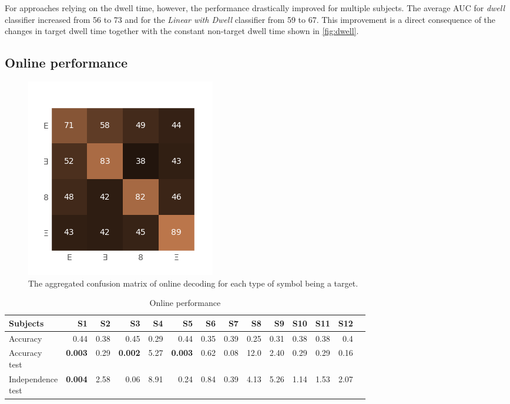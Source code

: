 \documentclass[12pt]{iopart}
\begin{document}
For approaches relying on the dwell time, however, the performance drastically improved
for multiple subjects. The average AUC for \textit{dwell} classifier increased
from 56 to 73 and for the \textit{Linear with Dwell} classifier from 59 to 67.
This improvement is a direct consequence of the changes in target dwell time
together with the constant non-target dwell time shown in \ref{fig:dwell}.


\subsection{Online performance}

\begin{figure}[!t]
    \includegraphics[trim={0cm 0cm 0cm 0cm},clip,width=0.5\columnwidth]{../images/OnlineConfusion.png}
    \caption{The aggregated confusion matrix of online decoding for each type of symbol being
    a target.}
\label{fig:onlineconf}
\end{figure}


\begin{table}
    \centering
    \caption{Online performance}
    \scriptsize
    \renewcommand{\arraystretch}{1.5}
    \begin{tabular}{l r r r r r r r r r r r r r}
        \hline
        Subjects & S1 & S2 & S3 & S4 & S5 & S6 & S7 & S8 & S9 & S10 & S11 & S12 \\
        \hline

        Accuracy & 0.44 & 0.38 & 0.45 & 0.29 & 0.44 & 0.35 & 0.39 & 0.25 & 0.31 & 0.38 & 0.38 & 0.4 \\ 
        \shortstack{Accuracy \\ test} & \textbf{0.003} & 0.29 & \textbf{0.002} & 5.27 & \textbf{0.003} & 0.62 & 0.08 & 12.0 & 2.40 & 0.29 & 0.29 &
        0.16 \\
        \shortstack{Independence \\ test}  & \textbf{ 0.004} & 2.58 & 0.06 & 8.91 & 0.24 & 0.84 & 0.39 & 4.13 & 5.26 & 1.14 & 1.53
        & 2.07 \\
        \hline
    \end{tabular}
    \label{tab:onlineperf}
\end{table}
\end{document}
